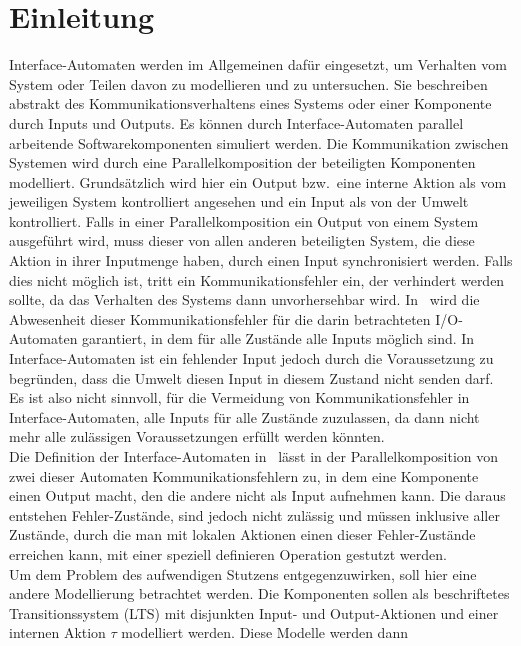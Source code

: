 \chapter{Einleitung}

Interface-Automaten werden im Allgemeinen dafür eingesetzt, um Verhalten vom
System oder Teilen davon zu modellieren und zu
untersuchen. Sie beschreiben abstrakt des Kommunikationsverhaltens
eines Systems oder einer Komponente durch Inputs und Outputs. Es können durch
Interface-Automaten
parallel arbeitende Softwarekomponenten simuliert werden. Die Kommunikation
zwischen  Systemen wird durch eine Parallelkomposition der beteiligten Komponenten
modelliert. Grundsätzlich wird hier ein Output bzw.\ eine
interne Aktion als vom jeweiligen System
kontrolliert angesehen und ein Input als von der Umwelt kontrolliert. Falls in
einer Parallelkomposition ein Output von einem System ausgeführt wird, muss
dieser von allen anderen beteiligten System, die diese Aktion in ihrer
Inputmenge haben, durch einen
Input synchronisiert werden. Falls dies nicht möglich ist, tritt ein
Kommunikationsfehler ein, der verhindert werden sollte, da das
Verhalten des Systems dann unvorhersehbar wird. In~\cite{Lynch1996} wird die
Abwesenheit dieser Kommunikationsfehler
für die darin betrachteten I/O-Automaten garantiert, in dem für alle Zustände alle Inputs möglich
sind. In Interface-Automaten ist ein fehlender Input jedoch durch die
Voraussetzung zu begründen, dass die Umwelt diesen Input in diesem Zustand nicht senden
darf. Es ist also nicht sinnvoll, für die Vermeidung von Kommunikationsfehler
in Interface-Automaten, alle Inputs für alle Zustände zuzulassen, da dann nicht
mehr alle zulässigen Voraussetzungen erfüllt werden könnten.\\
Die Definition der Interface-Automaten in~\cite{Alfaro2004} lässt
in der Parallelkomposition von zwei dieser Automaten Kommunikationsfehlern zu,
in dem eine Komponente einen Output macht, den die andere nicht als Input
aufnehmen kann. Die daraus entstehen Fehler-Zustände, sind jedoch nicht
zulässig und müssen inklusive aller Zustände, durch die man mit lokalen
Aktionen einen dieser Fehler-Zustände erreichen kann, mit einer speziell definieren
Operation gestutzt werden.\\
Um dem Problem des aufwendigen Stutzens entgegenzuwirken, soll hier eine
andere Modellierung betrachtet werden. Die Komponenten sollen als beschriftetes
Transitionssystem (LTS) mit disjunkten Input- und Output-Aktionen und einer
internen Aktion $\tau$ modelliert werden. Diese Modelle werden dann
